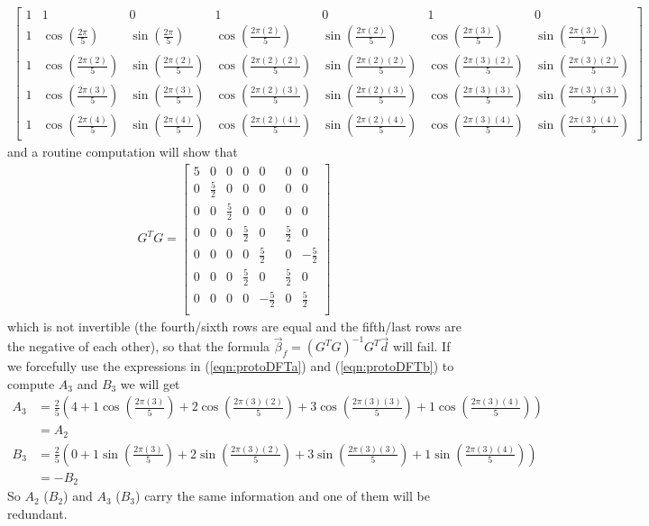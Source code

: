 {\begin{align*}
\begin{bmatrix}
1 & 1 & 0 & 1 & 0 & 1 & 0 \\
1 & \cos(\frac{2\pi}{5}) & \sin(\frac{2\pi}{5}) & \cos(\frac{2\pi(2)}{5}) & \sin(\frac{2\pi(2)}{5}) & \cos(\frac{2\pi(3)}{5}) & \sin(\frac{2\pi(3)}{5})\\
1 & \cos(\frac{2\pi(2)}{5}) & \sin(\frac{2\pi(2)}{5}) & \cos(\frac{2\pi(2)(2)}{5}) & \sin(\frac{2\pi(2)(2)}{5}) & \cos(\frac{2\pi(3)(2)}{5}) & \sin(\frac{2\pi(3)(2)}{5}) \\
1 & \cos(\frac{2\pi(3)}{5}) & \sin(\frac{2\pi(3)}{5}) & \cos(\frac{2\pi(2)(3)}{5}) & \sin(\frac{2\pi(2)(3)}{5}) & \cos(\frac{2\pi(3)(3)}{5}) & \sin(\frac{2\pi(3)(3)}{5})\\
1 & \cos(\frac{2\pi(4)}{5}) & \sin(\frac{2\pi(4)}{5}) & \cos(\frac{2\pi(2)(4)}{5}) & \sin(\frac{2\pi(2)(4)}{5}) & \cos(\frac{2\pi(3)(4)}{5}) & \sin(\frac{2\pi(3)(4)}{5})
\end{bmatrix}    
\end{align*}
and a routine computation will show that
\begin{align*}
G^T G = 
\begin{bmatrix}
5 & 0 & 0 & 0 & 0 & 0 & 0 \\
0 & \frac{5}{2} & 0 & 0 & 0 & 0 & 0 \\
0 & 0 & \frac{5}{2} & 0 & 0 & 0 & 0 \\
0 & 0 & 0 & \frac{5}{2} & 0 & \frac{5}{2} & 0 \\
0 & 0 & 0 & 0 & \frac{5}{2} & 0 & -\frac{5}{2} \\
0 & 0 & 0 & \frac{5}{2} & 0 & \frac{5}{2} & 0 \\
0 & 0 & 0 & 0 & -\frac{5}{2} & 0 & \frac{5}{2} \\
\end{bmatrix}
\end{align*}
which is not invertible (the fourth/sixth rows are equal and the fifth/last rows are the negative of each other), so that the formula $\vec{\beta}_f = (G^TG)^{-1}G^T\vec{d}$ will fail. If we forcefully use the expressions in (\ref{eqn:protoDFTa}) and (\ref{eqn:protoDFTb}) to compute $A_3$ and $B_3$ we will get
\begin{align*}
A_3 &= \frac{2}{5} (4 + 1\cos(\frac{2\pi(3)}{5}) + 2\cos(\frac{2\pi(3)(2)}{5}) + 3\cos(\frac{2\pi(3)(3)}{5}) + 1\cos(\frac{2\pi(3)(4)}{5})) \\
&= A_2 \\
B_3 &= \frac{2}{5} (0 + 1\sin(\frac{2\pi(3)}{5}) + 2\sin(\frac{2\pi(3)(2)}{5}) + 3\sin(\frac{2\pi(3)(3)}{5}) + 1\sin(\frac{2\pi(3)(4)}{5})) \\
&= -B_2    
\end{align*}
So $A_2$ ($B_2$) and $A_3$ ($B_3$) carry the same information and one of them will be redundant.
}

